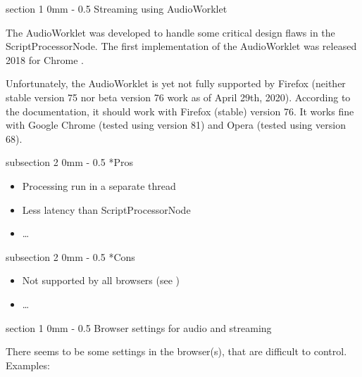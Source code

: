 \documentclass[11pt, a4paper, twoside]{article}
\makeatletter
\renewcommand{\subsection}{\@startsection
  {subsection}%
  {2}%
  {0mm}%
  {-\baselineskip}%
  {0.5\baselineskip}%
  {\bfseries\sffamily\large}}%
\renewcommand{\section}{\@startsection
  {section}%
  {1}%
  {0mm}%
  {-\baselineskip}%
  {0.5\baselineskip}%
  {\bfseries\sffamily\Large}}%
\makeatother
\begin{document}
\section{Streaming using AudioWorklet}

The AudioWorklet was developed to handle some critical design flaws in the ScriptProcessorNode. The first implementation of the AudioWorklet was released 2018 for Chrome \cite{icmc}.

Unfortunately, the AudioWorklet is yet not fully supported by Firefox (neither stable version 75 nor beta version 76 work as of April 29th, 2020). According to the documentation, it should work with Firefox (stable) version 76. It works fine with Google Chrome (tested using version 81) and Opera (tested using version 68).


\subsection*{Pros}
\begin{itemize}
\item Processing run in a separate thread
\item Less latency than ScriptProcessorNode
\item \ldots
\end{itemize}

\subsection*{Cons}
\begin{itemize}
\item Not supported by all browsers (see \cite{audioworklet})
\item \ldots
\end{itemize}




\section{Browser settings for audio and streaming}

There seems to be some settings in the browser(s), that are difficult to control. Examples:
\end{document}
